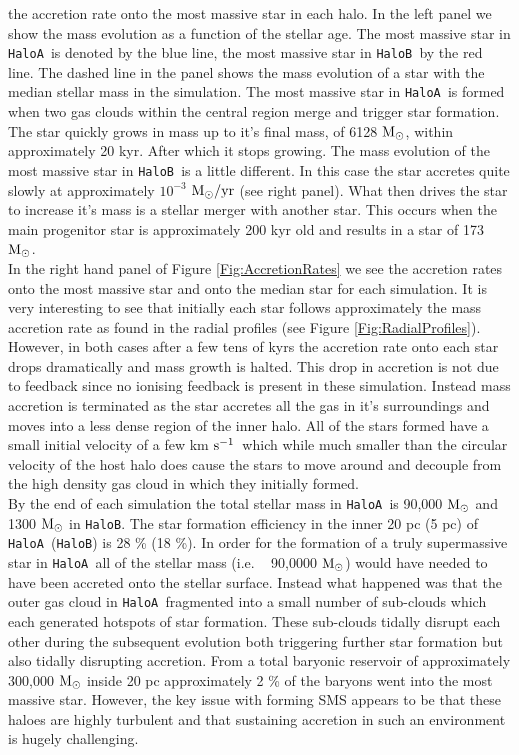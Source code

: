 \documentclass[graphics, twocolumn, usenatbib]{mn2e}
\newcommand{\kms} {km $\rm{s^{-1}}$}
\newcommand{\msolar} {$\rm{M_{\odot}}~$}
\newcommand{\msolarc} {$\rm{M_{\odot}}$}
\newcommand{\msolaryr} {$\rm{M_{\odot}/yr}~$}
\newcommand{\ha} {\texttt{HaloA~}}
\newcommand{\hb} {\texttt{HaloB~}}
\newcommand{\hbc} {\texttt{HaloB}}
\begin{document}
the accretion rate onto the most massive star in each halo. In the left panel we show the mass
evolution as a function of the stellar age. The most massive star in \ha is denoted by the blue line,
the most massive star in \hb by the red line. The dashed line in the panel shows the mass evolution
of a star with the median stellar mass in the simulation. The most massive star in \ha is formed
when two gas clouds within the central region merge and trigger star formation. The star quickly
grows in mass up to it's final mass, of 6128 \msolarc, within approximately 20 kyr. After which
it stops growing. The mass evolution of the most massive star in
\hb is a little different. In this case the star accretes quite slowly at approximately $10^{-3}$
\msolaryr (see right panel). What then drives the star to increase it's mass is a stellar merger
with another star. This occurs when the main progenitor star is approximately 200 kyr old and
results in a star of 173 \msolarc. \\
\indent In the right hand panel of Figure \ref{Fig:AccretionRates} we see the accretion rates onto
the most massive star and onto the median star for each simulation. It is very interesting to see that
initially each star follows approximately the mass accretion rate as found in the radial profiles
(see Figure \ref{Fig:RadialProfiles}).
However, in both cases after a few tens of kyrs the accretion rate onto each star drops dramatically
and mass growth is halted. This drop in accretion is not due to feedback since no ionising feedback
is present in these simulation. Instead mass accretion is terminated as the star accretes all the
gas in it's surroundings and moves into a less dense region of the inner halo. All of the stars
formed have a small initial velocity of a few \kms \ which while much smaller than the circular
velocity of the host halo does cause the stars to move around and decouple from the high density
gas cloud in which they initially formed. \\
\indent By the end of each simulation the total stellar mass in \ha is 90,000 \msolar and 1300
\msolar in \hbc. The star formation efficiency in the inner 20 pc (5 pc) of \ha (\hbc) is 28 \%
(18 \%).  In order for the formation of a truly supermassive star in \ha all of the stellar mass
(i.e. ~ 90,0000 \msolarc) would have needed to have been accreted onto the stellar surface. Instead
what happened was that the outer gas cloud in \ha fragmented into a small number of sub-clouds which
each generated hotspots of star formation. These sub-clouds tidally disrupt each other during the
subsequent evolution both triggering further star formation but also tidally disrupting accretion.
From a total baryonic reservoir of approximately 300,000 \msolar inside 20 pc approximately 2 \% of
the baryons went into the most massive star. However, the key issue with forming SMS appears to be that
these haloes are highly turbulent and that sustaining accretion in such an environment is
hugely challenging. 
\end{document}
